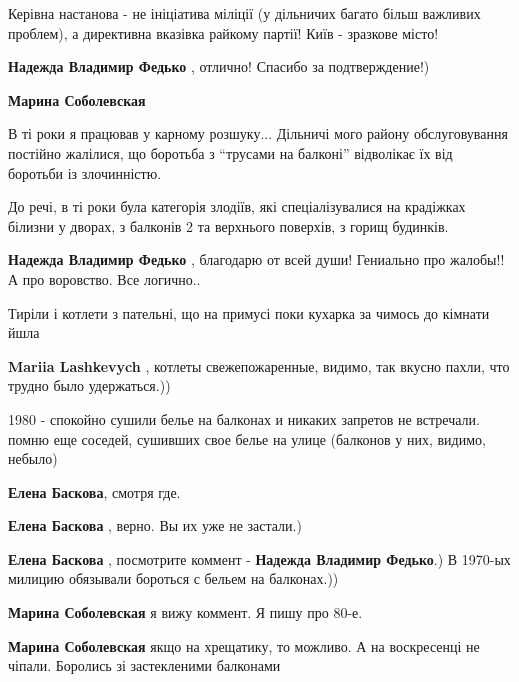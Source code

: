 \begin{itemize}
Керівна настанова - не ініціатива міліції (у дільничих багато більш важливих
проблем), а директивна вказівка райкому партії! Київ - зразкове місто!

\begin{itemize} %
\textbf{Надежда Владимир Федько} , отлично! Спасибо за подтверждение!)

\textbf{Марина Соболевская} 

В ті роки я працював у карному розшуку... Дільничі мого району обслуговування
постійно жалілися, що боротьба з \enquote{трусами на балконі} відволікає їх від
боротьби із злочинністю.

До речі, в ті роки була категорія злодіїв, які спеціалізувалися на крадіжках
білизни у дворах, з балконів 2 та верхнього поверхів, з горищ будинків.


\textbf{Надежда Владимир Федько} , благодарю от всей души! Гениально про жалобы!! А про воровство. Все логично..
\end{itemize} %

Тиріли і котлети з пательні, що на примусі поки кухарка за чимось до кімнати йшла

\begin{itemize} %
\textbf{Mariia Lashkevych} , котлеты свежепожаренные, видимо, так вкусно пахли, что трудно было удержаться.))
\end{itemize} %


1980 - спокойно сушили белье на балконах и никаких запретов не встречали.
помню еще соседей, сушивших свое белье на улице (балконов у них, видимо, небыло)

\begin{itemize} %
\textbf{Елена Баскова}, смотря где.

\textbf{Елена Баскова} , верно. Вы их уже не застали.)

\textbf{Елена Баскова} , посмотрите коммент - \textbf{Надежда Владимир Федько}.) В 1970-ых милицию обязывали бороться с бельем на балконах.))

\begin{itemize} %
\textbf{Марина Соболевская} я вижу коммент. Я пишу про 80-е.

\textbf{Марина Соболевская} якщо на хрещатику, то можливо. А на воскресенці не чіпали. Боролись зі застекленими балконами


\end{itemize}
\end{itemize}
\end{itemize}
